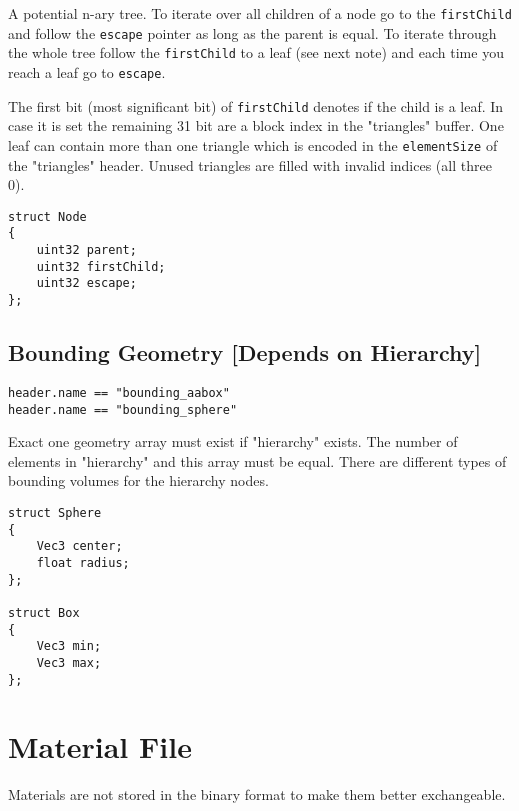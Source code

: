 \documentclass[english,10pt,a4paper,twocolumn,colorscheme=green]{orarticle}
\begin{document}
	A potential n-ary tree. To iterate over all children of a node go to the \lstinline|firstChild| and follow the \lstinline|escape| pointer as long as the parent is equal. To iterate through the whole tree follow the \lstinline|firstChild| to a leaf (see next note) and each time you reach a leaf go to \lstinline|escape|.
	
	The first bit (most significant bit) of \lstinline|firstChild| denotes if the child is a leaf. In case it is set the remaining 31 bit are a block index in the "triangles" buffer. One leaf can contain more than one triangle which is encoded in the \lstinline|elementSize| of the "triangles" header. Unused triangles are filled with invalid indices (all three 0).
	\begin{lstlisting}
struct Node
{
	uint32 parent;
	uint32 firstChild;
	uint32 escape;
};
	\end{lstlisting}
	
	\subsection{Bounding Geometry [Depends on Hierarchy]}
	\lstinline|header.name == "bounding_aabox"|\\
	\lstinline|header.name == "bounding_sphere"|
	
	Exact one geometry array must exist if "hierarchy" exists. The number of elements in "hierarchy" and this array must be equal. There are different types of bounding volumes for the hierarchy nodes.
	\begin{lstlisting}
struct Sphere
{
	Vec3 center;
	float radius;
};

struct Box
{
	Vec3 min;
	Vec3 max;
};
	\end{lstlisting}
	
	
		
	\section{Material File}
	Materials are not stored in the binary format to make them better exchangeable.
	
		
\end{document}
